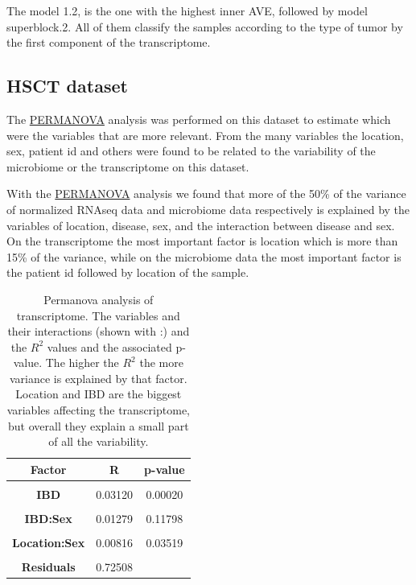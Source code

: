 \documentclass[
  12pt,
  a4paper,
  twoside,
  openright]{book}
\begin{document}
The model 1.2, is the one with the highest inner AVE, followed by model superblock.2.
All of them classify the samples according to the type of tumor by the first component of the transcriptome.

\FloatBarrier

\hypertarget{results-hsct}{%
\subsection{HSCT dataset}\label{results-hsct}}

The \protect\hyperlink{acronyms_PERMANOVA}{PERMANOVA} analysis was performed on this dataset to estimate which were the variables that are more relevant.
From the many variables the location, sex, patient id and others were found to be related to the variability of the microbiome or the transcriptome on this dataset.

With the \protect\hyperlink{acronyms_PERMANOVA}{PERMANOVA} analysis we found that more of the 50\% of the variance of normalized RNAseq data and microbiome data respectively is explained by the variables of location, disease, sex, and the interaction between disease and sex.
On the transcriptome the most important factor is location which is more than 15\% of the variance, while on the microbiome data the most important factor is the patient id followed by location of the sample.

\begin{table}[H]

\caption[Permanova analysis of transcriptome.]{\label{tab:hsct-permanova-RNAseq}Permanova analysis of transcriptome. The variables and their interactions (shown with :) and the $R^2$ values and the associated p-value. The higher the $R^2$ the more variance is explained by that factor. Location and IBD are the biggest variables affecting the transcriptome, but overall they explain a small part of all the variability.}
\centering
\begin{tabular}[t]{>{}c|c|c}
\hline
\textbf{Factor} & \textbf{R} & \textbf{p-value}\\
\hline
\textbf{\cellcolor{gray!6}{Location}} & \cellcolor{gray!6}{0.18057} & \cellcolor{gray!6}{0.00020}\\
\hline
\textbf{IBD} & 0.03120 & 0.00020\\
\hline
\textbf{\cellcolor{gray!6}{Sex}} & \cellcolor{gray!6}{0.01306} & \cellcolor{gray!6}{0.00120}\\
\hline
\textbf{IBD:Sex} & 0.01279 & 0.11798\\
\hline
\textbf{\cellcolor{gray!6}{Location:IBD}} & \cellcolor{gray!6}{0.02427} & \cellcolor{gray!6}{0.11458}\\
\hline
\textbf{Location:Sex} & 0.00816 & 0.03519\\
\hline
\textbf{\cellcolor{gray!6}{Location:IBD:Sex}} & \cellcolor{gray!6}{0.00486} & \cellcolor{gray!6}{0.52190}\\
\hline
\textbf{Residuals} & 0.72508 & \\
\hline
\end{tabular}
\end{table}
\end{document}
